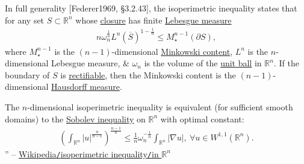 \documentclass[oneside]{book}
\numberwithin{equation}{section}
\begin{document}
In full generality [Federer1969, \S3.2.43], the isoperimetric inequality states that for any set $S\subset\mathbb{R}^n$ whose \href{https://en.wikipedia.org/wiki/Closure_of_a_set}{closure} has finite \href{https://en.wikipedia.org/wiki/Lebesgue_measure}{Lebesgue measure}
\begin{align*}
	n\omega_n^{\frac{1}{n}}L^n(\overline{S})^{1 - \frac{1}{n}}\le M_\star^{n - 1}(\partial S),
\end{align*}
where $M_\star^{n - 1}$ is the $(n - 1)$-dimensional \href{https://en.wikipedia.org/wiki/Minkowski_content}{Minkowski content}, $L^n$ is the $n$-dimensional Lebesgue measure, \& $\omega_n$ is the volume of the \href{https://en.wikipedia.org/wiki/Unit_ball}{unit ball} in $\mathbb{R}^n$. If the boundary of $S$ is \href{https://en.wikipedia.org/wiki/Rectifiable_curve}{rectifiable}, then the Minkowski content is the $(n - 1)$-dimensional \href{https://en.wikipedia.org/wiki/Hausdorff_measure}{Hausdorff measure}.

The $n$-dimensional isoperimetric inequality is equivalent (for sufficient smooth domains) to the \href{https://en.wikipedia.org/wiki/Sobolev_inequality}{Sobolev inequality} on $\mathbb{R}^n$ with optimal constant:
\begin{align*}
	\left(\int_{\mathbb{R}^n} |u|^{\frac{n}{n - 1}}\right)^{\frac{n - 1}{n}}\le\frac{1}{n}\omega_n^{-\frac{1}{n}}\int_{\mathbb{R}^n} |\nabla u|,\ \forall u\in W^{1,1}(\mathbb{R}^n).
\end{align*}
'' -- \href{https://en.wikipedia.org/wiki/Isoperimetric_inequality#In_Rn}{Wikipedia\texttt{/}isoperimetric inequality\texttt{/}in $\mathbb{R}^n$}
\end{document}
